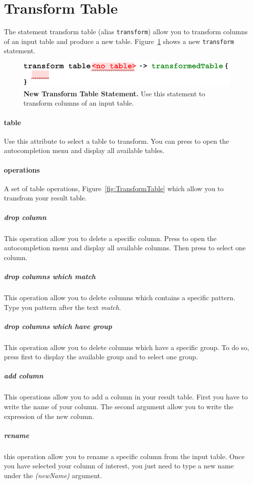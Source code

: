 \section{Transform Table}
The statement transform table (alias \texttt{transform})  allow you to transform columns of an input table and produce a new table. Figure~\ref{fig:NewTransformTable} shows a new \texttt{transform} statement.

\begin{figure}
  \centering
  \includegraphics[width=\figWidthNarrow]{figures/NewTransformTable.pdf}
\caption[New Transform Table  Statement.]{\textbf{New Transform Table Statement.} Use this statement to transform columns of an input table.}
\label{fig:NewTransformTable}
\end{figure}

\paragraph{table}
Use this attribute to select a table to transform. You can press \keys{\ctrl+\space} to open the autocompletion menu and display all available tables.

\paragraph{operations}
A set of table operations,  Figure~\ref{fig:TransformTable} which allow you to transfrom your result table.

\subparagraph{drop column} This operation allow you to delete a specific column. Press \keys{\ctrl+\space} to open the autocompletion menu and display all available columns. Then press  \keys{\return} to select one column.
\subparagraph{drop columns which match} This operation allow you to delete columns which contains a specific pattern. Type you pattern after the text \textit{match}.
\subparagraph{drop columns which have group} This operation allow you to delete columns which have a specific group. To do so, press first  to display the available group and \keys{\return} to select one group.
\subparagraph{add column}
This operations allow you to add a column in your result table. First you have to write the name of your column. The second argument allow you to write the expression of the new column.  
\subparagraph{rename} this operation allow you to rename a specific column from the input table. Once you have selected your column of interest, you just need to type a new name under the \textit{(newName)} argument.

